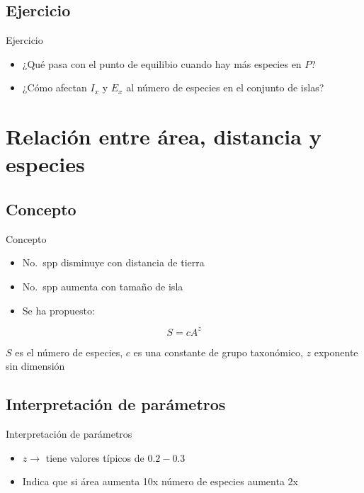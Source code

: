 \documentclass[
  11pt,
  ignorenonframetext,
]{beamer}
\begin{document}
\hypertarget{ejercicio-1}{%
\subsection{Ejercicio}\label{ejercicio-1}}

\begin{frame}{Ejercicio}
\begin{itemize}
\item
  ¿Qué pasa con el punto de equilibio cuando hay más especies en \(P\)?
\item
  ¿Cómo afectan \(I_x\) y \(E_x\) al número de especies en el conjunto
  de islas?
\end{itemize}
\end{frame}

\hypertarget{relaciuxf3n-entre-uxe1rea-distancia-y-especies}{%
\section{Relación entre área, distancia y
especies}\label{relaciuxf3n-entre-uxe1rea-distancia-y-especies}}

\hypertarget{concepto}{%
\subsection{Concepto}\label{concepto}}

\begin{frame}{Concepto}
\begin{itemize}
\item
  No.~spp disminuye con distancia de tierra
\item
  No.~spp aumenta con tamaño de isla
\item
  Se ha propuesto:
\end{itemize}

\[S = cA^z\]

\(S\) es el número de especies, \(c\) es una constante de grupo
taxonómico, \(z\) exponente sin dimensión
\end{frame}

\hypertarget{interpretaciuxf3n-de-paruxe1metros}{%
\subsection{Interpretación de
parámetros}\label{interpretaciuxf3n-de-paruxe1metros}}

\begin{frame}{Interpretación de parámetros}
\begin{itemize}
\item
  \(z \rightarrow\) tiene valores típicos de \(0.2-0.3\)
\item
  Indica que si área aumenta 10x número de especies aumenta 2x
\end{itemize}
\end{frame}
\end{document}
